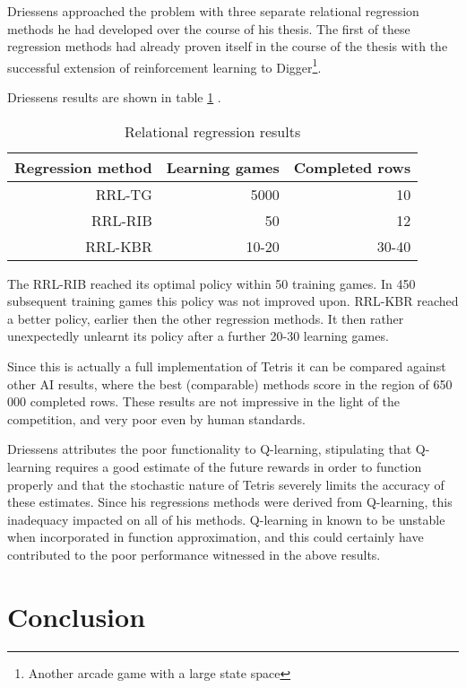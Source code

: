 \documentclass{rucsthesis}
\begin{document}
Driessens approached the problem with three separate relational regression methods \citep{kurt} he had developed over the course of his thesis. The first of these regression methods had already proven itself in the course of the thesis with the successful extension of reinforcement learning to Digger\footnote{Another arcade game with a large state space}. 

Driessens results are shown in table \ref{tbl:driessens} .

\begin{table}[h]
\centering
\begin{tabular}{|r|r|r|}
\hline
Regression method & Learning games & Completed rows  \\
\hline
RRL-TG	&	5000	& 	10   \\
\hline
RRL-RIB  &  50  & 12  \\
\hline
RRL-KBR  &  10-20  & 30-40  \\
\hline
\end{tabular}
\caption{Relational regression results \citep{kurt}}
\label{tbl:driessens}
\end{table}

The RRL-RIB reached its optimal policy within 50 training games. In 450 subsequent training games this policy was not improved upon. RRL-KBR reached a better policy, earlier then the other regression methods. It then rather unexpectedly unlearnt its policy after a further 20-30 learning games.

Since this is actually a full implementation of Tetris it can be compared against other AI results, where the best (comparable) methods score in the region of 650 000 completed rows\citep{tetstand}. These results are not impressive in the light of the competition, and very poor even by human standards. 

Driessens attributes the poor functionality to Q-learning, stipulating that Q-learning requires a good estimate of the future rewards in order to function properly and that the stochastic nature of Tetris severely limits the accuracy of these estimates. Since his regressions methods were derived from Q-learning, this inadequacy impacted on all of his methods. Q-learning in known to be unstable\citep[pg. 4]{keepaway,thrun93issues} when incorporated in function approximation, and this could certainly have contributed to the poor performance witnessed in the above results.

\section{Conclusion}
\end{document}
